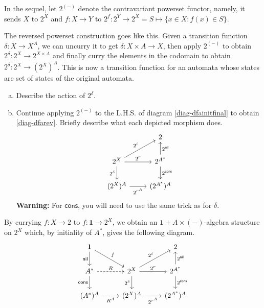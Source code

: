 \documentclass[main.tex]{subfiles}
\begin{document}
In the sequel, let $2^{(-)}$ denote the contravariant powerset functor, namely, it sends $X$ to $2^X$ and $f: X \rightarrow Y$ to $2^f: 2^Y \rightarrow 2^X = S \mapsto \{x \in X: f(x) \in S\}$.

The reversed powerset construction goes like this. Given a transition function $\delta: X \rightarrow X^A$, we can uncurry it to get $\delta : X\times A \rightarrow X$, then apply $2^{(-)}$ to obtain $2^{\delta}: 2^X \rightarrow 2^{X\times A}$ and finally curry the elements in the codomain to obtain $2^{\delta}: 2^X \rightarrow (2^X)^A$. This is now a transition function for an automata whose states are set of states of the original automata.
\begin{exer}[3pts]
    \begin{enumerate}[(a)]
        \item Describe the action of $2^{\delta}$.
        \item Continue applying $2^{(-)}$ to the L.H.S. of diagram \eqref{diag-dfainitfinal} to obtain \eqref{diag-dfarev}. Briefly describe what each depicted morphism does.
        \begin{equation}\label{diag-dfarev}
            \begin{tikzcd}
            & 2 \\
            2^X \arrow[ru, "2^i"] \arrow[d, "2^{\delta}"'] \arrow[r, "2^r"] & 2^{A^*} \arrow[u, "2^{\textsf{nil}}"'] \arrow[d, "2^{\textsf{cons}}"] \\
            (2^X)^A \arrow[r, "2^{r^A}"'] & (2^{A^*})^A 
            \end{tikzcd}
        \end{equation}
        \textbf{Warning:} For $\textsf{cons}$, you will need to use the same trick as for $\delta$.
    \end{enumerate}
\end{exer}
By currying $f:X \rightarrow 2$ to $f: \mathbf{1} \rightarrow 2^X$, we obtain an $\mathbf{1}+ A\times(-)$-algebra structure on $2^X$ which, by initiality of $A^*$, gives the following diagram.
\begin{equation}\label{diag-dfarevall}
\begin{tikzcd}
\mathbf{1} \arrow[rd, "f"] \arrow[d, "\textsf{nil}"'] & & 2 \\
A^* \arrow[d, "\textsf{cons}"'] \arrow[r, "R", dashed] & 2^X \arrow[ru, "2^i"] \arrow[d, "2^{\delta}"'] \arrow[r, "2^r"] & 2^{A^*} \arrow[u, "2^{\textsf{nil}}"'] \arrow[d, "2^{\textsf{cons}}"] \\
(A^*)^A \arrow[r, "R^A"', dashed] & (2^X)^A \arrow[r, "2^{r^A}"'] & (2^{A^*})^A 
\end{tikzcd}
\end{equation}
\end{document}
